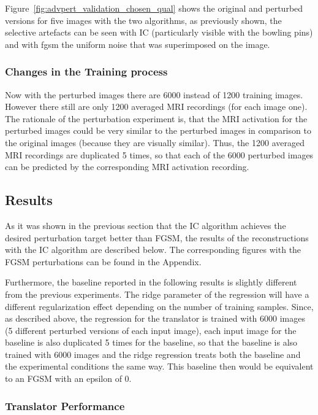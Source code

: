 Figure~\ref{fig:advpert_validation_chosen_qual} shows the original and perturbed versions for five images with the two algorithms, as previously shown, the selective artefacts can be seen with IC (particularly visible with the bowling pins) and with fgsm the uniform noise that was superimposed on the image. 

\subsubsection{Changes in the Training process}

Now with the perturbed images there are 6000 instead of 1200 training images. However there still are only 1200 averaged MRI recordings (for each image one). The rationale of the perturbation experiment is, that the MRI activation for the perturbed images could be very similar to the perturbed images in comparison to the original images (because they are visually similar). Thus, the 1200 averaged MRI recordings are duplicated 5 times, so that each of the 6000 perturbed images can be predicted by the corresponding MRI activation recording.


\subsection{Results}

As it was shown in the previous section that the IC algorithm achieves the desired perturbation target better than FGSM, the results of the reconstructions with the IC algorithm are described below. The corresponding figures with the FGSM perturbations can be found in the Appendix. 

Furthermore, the baseline reported in the following results is slightly different from the previous experiments. The ridge parameter of the regression will have a different regularization effect depending on the number of training samples. Since, as described above, the regression for the translator is trained with 6000 images (5 different perturbed versions of each input image), each input image for the baseline is also duplicated 5 times for the baseline, so that the baseline is also trained with 6000 images and the ridge regression treats both the baseline and the experimental conditions the same way. This baseline then would be equivalent to an FGSM with an epsilon of 0. 

\subsubsection{Translator Performance}


